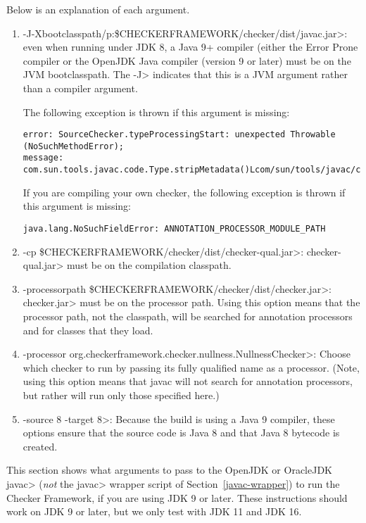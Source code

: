 Below is an explanation of each argument.
\begin{enumerate}
\item \<-J-Xbootclasspath/p:\$CHECKERFRAMEWORK/checker/dist/javac.jar>:
even when running under JDK 8, a Java 9+ compiler (either the Error Prone
compiler or the OpenJDK Java compiler (version 9 or later) must be on the JVM bootclasspath.
The \<-J> indicates that this is a JVM argument rather than a compiler
argument.

The following exception is thrown if this argument is missing:
\begin{Verbatim}
error: SourceChecker.typeProcessingStart: unexpected Throwable (NoSuchMethodError);
message: com.sun.tools.javac.code.Type.stripMetadata()Lcom/sun/tools/javac/code/Type;
\end{Verbatim}

If you are compiling your own checker, the following exception is thrown if this argument is missing:
\begin{Verbatim}
java.lang.NoSuchFieldError: ANNOTATION_PROCESSOR_MODULE_PATH
\end{Verbatim}

\item \<-cp \$CHECKERFRAMEWORK/checker/dist/checker-qual.jar>: \<checker-qual.jar>
must be on the compilation classpath.

\item \<-processorpath \$CHECKERFRAMEWORK/checker/dist/checker.jar>:
\<checker.jar> must be on the processor path. Using this option means that the processor path, not
the classpath, will be searched for annotation processors
and for classes that they load.

\item \<-processor org.checkerframework.checker.nullness.NullnessChecker>:
Choose which checker to run by passing its fully qualified name as a processor.
(Note, using this option means that javac will not search for annotation
processors, but rather will run only those specified here.)

\item \<-source 8 -target 8>: Because the build is using
a Java 9 compiler, these options ensure that the
source code is Java 8 and that Java 8 bytecode is created.

\end{enumerate}



This section shows what arguments to pass to the OpenJDK or OracleJDK
\<javac> (\emph{not} the \<javac> wrapper script of
Section~\ref{javac-wrapper}) to run the Checker
Framework, if you are using JDK 9 or later.  These
instructions should work on JDK 9 or later, but we only test with JDK 11 and JDK 16.


